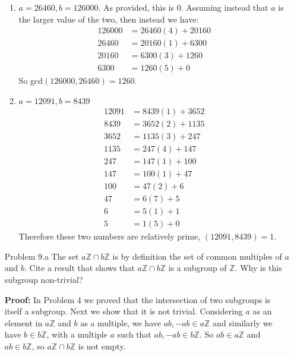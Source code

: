 \documentclass[letterpaper]{article}
\newcommand{\Integers}{\mathbb{Z}}
\begin{document}
\begin{itemize}
            \begin{enumerate}
                  \item \(a = 26460, b = 126000\). As provided, this is 0. Assuming instead that \(a\) is the larger value of the two, then instead we have:
                        \begin{align*}
                              126000 & = 26460(4) + 20160 \\
                              26460  & = 20160(1) + 6300  \\
                              20160  & = 6300(3) + 1260   \\
                              6300   & = 1260(5) + 0
                        \end{align*}
                        So gcd\((126000, 26460) = 1260\).
                  \item \(a = 12091, b = 8439\)
                        \begin{align*}
                              12091 & = 8439(1) + 3652 \\
                              8439  & = 3652(2) + 1135 \\
                              3652  & = 1135(3) + 247  \\
                              1135  & = 247(4) + 147   \\
                              247   & = 147(1) + 100   \\
                              147   & = 100(1) + 47    \\
                              100   & = 47(2) + 6      \\
                              47    & = 6(7) + 5       \\
                              6     & = 5(1) + 1       \\
                              5     & = 1(5) + 0
                        \end{align*}
                        Therefore these two numbers are relatively prime, \((12091, 8439) = 1\).
            \end{enumerate}

      \item[Problem 9.a] The set \(a\Integers \cap b\Integers\) is by definition the set of common multiples of \(a\) and \(b\). Cite a result that shows that \(a\Integers \cap b\Integers\) is a subgroup of \(\Integers\). Why is this subgroup non-trivial?

            \textbf{Proof: }In Problem 4 we proved that the intersection of two subgroups is itself a subgroup. Next we show that it is not trivial. Considering \(a\) as an element in \(a\Integers\) and \(b\) as a multiple, we have \(ab, -ab \in a\Integers\) and similarly we have \(b \in b\Integers\), with a multiple \(a\) such that \(ab, -ab \in b\Integers\). So \(ab \in a\Integers\) and \(ab \in b\Integers\), so \(a\Integers \cap b\Integers\) is not empty.


\end{itemize}
\end{document}
